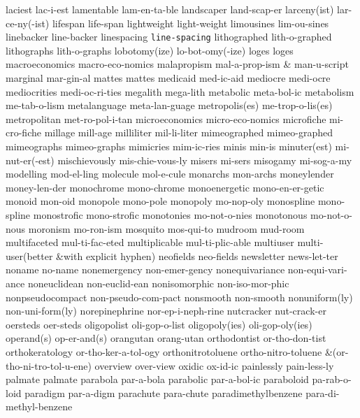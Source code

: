 \1 laciest		lac-i-est
\1 lamentable		lam-en-ta-ble
\1 landscaper		land-scap-er
\1 larceny(ist) 	lar-ce-ny(-ist) 
\1 lifespan		life-span
\1 lightweight		light-weight
\1 limousines		lim-ou-sines
\1 linebacker		line-backer
\1 linespacing		{\tt\bs line-spacing}
\1 lithographed		lith-o-graphed
\1 lithographs		lith-o-graphs
\1 lobotomy(ize)	lo-bot-omy(-ize)
\1 loges		loges
\1 macroeconomics	macro-eco-nomics
\1 malapropism		mal-a-prop-ism
 & man-u-script \cr
\1 marginal		mar-gin-al
\1 mattes		mattes
\1 medicaid		med-ic-aid
\1 mediocre		medi-ocre
\1 mediocrities		medi-oc-ri-ties
\1 megalith		mega-lith
\1 metabolic		meta-bol-ic
\1 metabolism		me-tab-o-lism
\1 metalanguage		meta-lan-guage
\1 metropolis(es)	me-trop-o-lis(es)
\1 metropolitan		met-ro-pol-i-tan
\1 microeconomics	micro-eco-nomics
\1 microfiche		mi-cro-fiche
\1 millage		mill-age
\1 milliliter		mil-li-liter
\1 mimeographed 	mimeo-graphed
\1 mimeographs		mimeo-graphs
\1 mimicries		mim-ic-ries
\1 minis		min-is
\1 minuter(est)		mi-nut-er(-est)
\1 mischievously	mis-chie-vous-ly
\1 misers		mi-sers
\1 misogamy		mi-sog-a-my
\1 modelling		mod-el-ling
\1 molecule		mol-e-cule
\1 monarchs		mon-archs
\1 moneylender		money-len-der
\1 monochrome		mono-chrome
\1 monoenergetic	mono-en-er-getic
\1 monoid		mon-oid
\1 monopole		mono-pole
\1 monopoly		mo-nop-oly
\1 monospline		mono-spline
\1 monostrofic		mono-strofic
\1 monotonies		mo-not-o-nies
\1 monotonous		mo-not-o-nous
\1 moronism		mo-ron-ism
\1 mosquito		mos-qui-to
\1 mudroom		mud-room
\1 multifaceted 	mul-ti-fac-eted
\1 multiplicable	mul-ti-plic-able
\1 multiuser		multi-user\quad (better
\tabalign		&\null\quad with explicit hyphen)\cr
\1 neofields		neo-fields
\1 newsletter		news-let-ter
\1 noname		no-name
\1 nonemergency 	non-emer-gency
\1 nonequivariance	non-equi-vari-ance
\1 noneuclidean 	non-euclid-ean
\1 nonisomorphic	non-iso-mor-phic
\1 nonpseudocompact	non-pseudo-com-pact
\1 nonsmooth		non-smooth
\1 nonuniform(ly)	non-uni-form(ly)
\1 norepinephrine	nor-ep-i-neph-rine
\1 nutcracker		nut-crack-er
\1 oersteds		oer-steds
\1 oligopolist		oli-gop-o-list
\1 oligopoly(ies)	oli-gop-oly(ies)
\1 operand(s)		op-er-and(s)
\1 orangutan		orang-utan
\1 orthodontist 	or-tho-don-tist
\1 orthokeratology	or-tho-ker-a-tol-ogy
\1 orthonitrotoluene	ortho-nitro-toluene
\tabalign		&\null\quad (or-tho-ni-tro-tol-u-ene)\cr
\1 overview		over-view
\1 oxidic		ox-id-ic
\1 painlessly		pain-less-ly
\1 palmate		palmate
\1 parabola		par-a-bola
\1 parabolic		par-a-bol-ic
\1 paraboloid		pa-rab-o-loid
\1 paradigm		par-a-digm
\1 parachute		para-chute
\1 paradimethylbenzene	para-di-methyl-benzene
